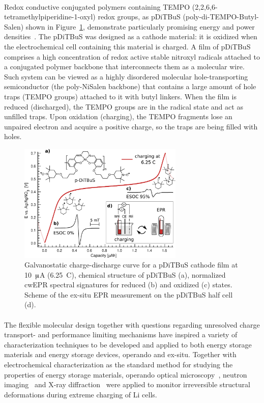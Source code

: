 \paragraph*{}
Redox conductive conjugated polymers containing TEMPO (2,2,6,6-tetramethylpiperidine-1-oxyl) redox groups, as pDiTBuS (poly-di-TEMPO-Butyl-Salen) shown in Figure~\ref{fig:Figure_1}, demonstrate particularly promising energy and power densities~\cite{Vereshchagin2020}. The pDiTBuS was designed as a cathode material: it is oxidized when the electrochemical cell containing this material is charged. A film of pDiTBuS comprises a high concentration of redox active stable nitroxyl radicals attached to a conjugated polymer backbone that interconnects them as a molecular wire. Such system can be viewed as a highly disordered molecular hole-transporting semiconductor (the poly-NiSalen backbone) that contains a large amount of hole traps (TEMPO groups) attached to it with butyl linkers. When the film is reduced (discharged), the TEMPO groups are in the radical state and act as unfilled traps. Upon oxidation (charging), the TEMPO fragments lose an unpaired electron and acquire a positive charge, so the traps are being filled with holes.

\begin{figure}[h]
\center
	\includegraphics[width=0.7\textwidth]{./introduction/figures/Figure_1.pdf}
	\caption{Galvanostatic charge-discharge curve for a pDiTBuS cathode film at 10~$\muup$A (6.25~C), chemical structure of pDiTBuS (a), normalized cwEPR spectral signatures for reduced (b) and oxidized (c) states. Scheme of the ex-situ EPR measurement on the pDiTBuS half cell (d).}
	\label{fig:Figure_1}
\end{figure}


\paragraph{}
The flexible molecular design together with questions regarding unresolved charge transport- and performance limiting mechanisms have inspired a variety of characterization techniques to be developed and applied to both energy storage materials and energy storage devices, operando and ex-situ. Together with electrochemical characterization as the standard method for studying the properties of energy storage materials\cite{IWASA2007,Zens2022}, operando optical microscopy~\cite{Merryweather2022}, neutron imaging~\cite{Ma2020} and X-ray diffraction~\cite{Rhodes2012} were applied to monitor irreversible structural deformations during extreme charging of Li cells.

